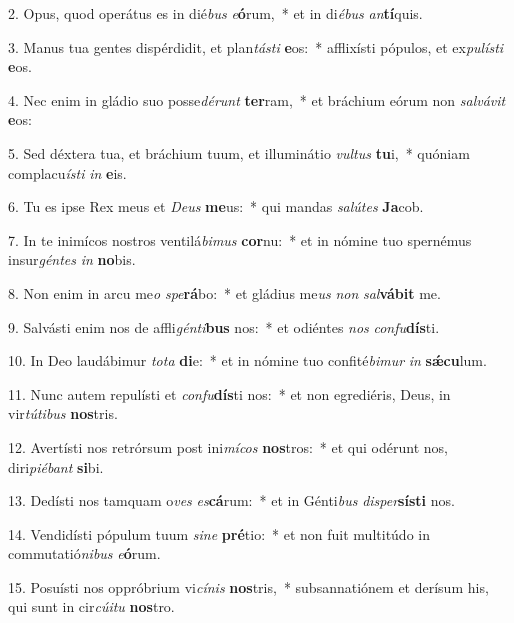 2. Opus, quod operátus es in dié\textit{bus} \textit{e}\textbf{ó}rum,~*  et in di\textit{é}\textit{bus} \textit{an}\textbf{tí}quis.\

3. Manus tua gentes dispérdidit, et plan\textit{tás}\textit{ti} \textbf{e}os:~*  afflixísti pópulos, et ex\textit{pu}\textit{lís}\textit{ti} \textbf{e}os.\

4. Nec enim in gládio suo posse\textit{dé}\textit{runt} \textbf{ter}ram,~*  et bráchium eórum non \textit{sal}\textit{vá}\textit{vit} \textbf{e}os:\

5. Sed déxtera tua, et bráchium tuum, et illuminátio \textit{vul}\textit{tus} \textbf{tu}i,~*  quóniam complacu\textit{ís}\textit{ti} \textit{in} \textbf{e}is.\

6. Tu es ipse Rex meus et \textit{De}\textit{us} \textbf{me}us:~*  qui mandas \textit{sa}\textit{lú}\textit{tes} \textbf{Ja}cob.\

7. In te inimícos nostros ventilá\textit{bi}\textit{mus} \textbf{cor}nu:~*  et in nómine tuo spernémus insur\textit{gén}\textit{tes} \textit{in} \textbf{no}bis.\

8. Non enim in arcu me\textit{o} \textit{spe}\textbf{rá}bo:~*  et gládius me\textit{us} \textit{non} \textit{sal}\textbf{vá}\textbf{bit} me.\

9. Salvásti enim nos de affli\textit{gén}\textit{ti}\textbf{bus} nos:~*  et odiéntes \textit{nos} \textit{con}\textit{fu}\textbf{dís}ti.\

10. In Deo laudábimur \textit{to}\textit{ta} \textbf{di}e:~*  et in nómine tuo confité\textit{bi}\textit{mur} \textit{in} \textbf{sǽ}\textbf{cu}lum.\

11. Nunc autem repulísti et \textit{con}\textit{fu}\textbf{dís}ti nos:~*  et non egrediéris, Deus, in vir\textit{tú}\textit{ti}\textit{bus} \textbf{nos}tris.\

12. Avertísti nos retrórsum post ini\textit{mí}\textit{cos} \textbf{nos}tros:~*  et qui odérunt nos, diri\textit{pi}\textit{é}\textit{bant} \textbf{si}bi.\

13. Dedísti nos tamquam o\textit{ves} \textit{es}\textbf{cá}rum:~*  et in Génti\textit{bus} \textit{di}\textit{sper}\textbf{sís}\textbf{ti} nos.\

14. Vendidísti pópulum tuum \textit{si}\textit{ne} \textbf{pré}tio:~*  et non fuit multitúdo in commutatió\textit{ni}\textit{bus} \textit{e}\textbf{ó}rum.\

15. Posuísti nos oppróbrium vi\textit{cí}\textit{nis} \textbf{nos}tris,~*  subsannatiónem et derísum his, qui sunt in cir\textit{cú}\textit{i}\textit{tu} \textbf{nos}tro.\

